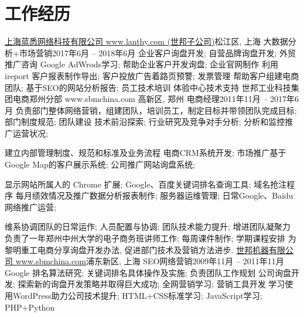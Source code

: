 \section{\textbf{工作经历}}
  \resumeSubHeadingListStart
    \resumeSubheading
      {\href{http://www.lanthy.com/}{上海蓝悉网络科技有限公司 www.lanthy.com (世邦子公司)}}{松江区, 上海}
      {大数据分析+市场营销}{2017年6月 -- 2018年6月}
      \resumeItemListStart
          {企业客户询盘开发; 自营品牌询盘开发; 外贸推广咨询}
          {Google AdWrods学习; 帮助企业客户开发询盘; 企业官网制作}
          {利用 ireport 客户报表制作导出; 客户投放广告着路页预警; 发票管理}
          {帮助客户组建电商团队; 基于SEO的网站分析报告; 员工技术培训}
          {体验中心技术支持}
      \resumeItemListEnd
    \resumeSubheading
      {世邦工业科技集团电商郑州分部 www.sbmchina.com }{高新区, 郑州}
      {电商经理}{2011年11月 -- 2017年6月}
      \resumeItemListStart
          {负责部门整体网络营销，组建团队，培训员工，制定目标并带领团队完成目标; 部门制度规范; 团队建设}
          {技术前沿探索; 行业研究及竞争对手分析; 分析和监控推广运营状况;}

          {建立内部管理制度、规范和标准及业务流程}
          {电商CRM系统开发; 市场推广基于Google Map的客户展示系统; 公司推广网站询盘系统; }

          {显示网站所属人的 Chrome 扩展; Google、百度关键词排名查询工具; 域名抢注程序 }
          {每月绩效情况及推广数据分析报表制作; 服务器运维管理; 日常Google、Baidu网络推广运营;}

          {维系协调团队的日常运作; 人员配置与协调; 团队技术能力提升; 增进团队凝聚力}
          {负责了一年郑州中州大学的电子商务班讲师工作; 每周课件制作; 学期课程安排}
          {为黎明重工电商分享询盘开发办法, 促进部门技术及营销方法进步.}
      \resumeItemListEnd
    \resumeSubheading
      {\href{http://www.shibangchina.com/}{世邦机器有限公司 www.sbmchina.com}}{浦东新区, 上海}
      {SEO网络营销}{2009年11月 -- 2011年11月}
      \resumeItemListStart
          {Google 排名算法研究; 关键词排名具体操作及实施; 负责团队工作规划}
          {公司询盘开发; 探索新的询盘开发策略并取得巨大成功; 全网营销学习; 营销工具开发}
          {学习使用WordPress助力公司技术提升; HTML+CSS标准学习; JavaScript学习; PHP+Python}
      \resumeItemListEnd
  \resumeSubHeadingListEnd
